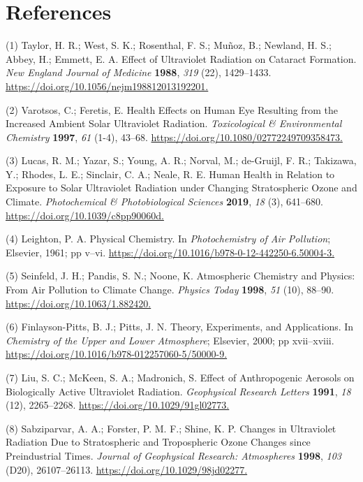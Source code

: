 \documentclass[10pt]{article}
\begin{document}
\FloatBarrier
\section*{References}\sloppy
{}
\label{csl:1}(1) Taylor, H. R.; West, S. K.; Rosenthal, F. S.; Mu{\~{n}}oz, B.; Newland, H. S.; Abbey, H.; Emmett, E. A. {Effect of Ultraviolet Radiation on Cataract Formation}. \textit{New England Journal of Medicine} \textbf{1988}, \textit{319} (22), 1429–1433. \url{https://doi.org/10.1056/nejm198812013192201.}

\label{csl:2}(2) Varotsos, C.; Feretis, E. {Health Effects on Human Eye Resulting from the Increased Ambient Solar Ultraviolet Radiation}. \textit{Toxicological {\&} Environmental Chemistry} \textbf{1997}, \textit{61} (1-4), 43–68. \url{https://doi.org/10.1080/02772249709358473.}

\label{csl:3}(3) Lucas, R. M.; Yazar, S.; Young, A. R.; Norval, M.; de-Gruijl, F. R.; Takizawa, Y.; Rhodes, L. E.; Sinclair, C. A.; Neale, R. E. {Human Health in Relation to Exposure to Solar Ultraviolet Radiation under Changing Stratospheric Ozone and Climate}. \textit{Photochemical {\&} Photobiological Sciences} \textbf{2019}, \textit{18} (3), 641–680. \url{https://doi.org/10.1039/c8pp90060d.}

\label{csl:4}(4) Leighton, P. A. {Physical Chemistry}. In \textit{Photochemistry of Air Pollution}; Elsevier, 1961; pp v--vi. \url{https://doi.org/10.1016/b978-0-12-442250-6.50004-3.}

\label{csl:5}(5) Seinfeld, J. H.; Pandis, S. N.; Noone, K. {Atmospheric Chemistry and Physics: From Air Pollution to Climate Change}. \textit{Physics Today} \textbf{1998}, \textit{51} (10), 88–90. \url{https://doi.org/10.1063/1.882420.}

\label{csl:6}(6) Finlayson-Pitts, B. J.; Pitts, J. N. {Theory, Experiments, and Applications}. In \textit{Chemistry of the Upper and Lower Atmosphere}; Elsevier, 2000; pp xvii--xviii. \url{https://doi.org/10.1016/b978-012257060-5/50000-9.}

\label{csl:7}(7) Liu, S. C.; McKeen, S. A.; Madronich, S. {Effect of Anthropogenic Aerosols on Biologically Active Ultraviolet Radiation}. \textit{Geophysical Research Letters} \textbf{1991}, \textit{18} (12), 2265–2268. \url{https://doi.org/10.1029/91gl02773.}

\label{csl:8}(8) Sabziparvar, A. A.; Forster, P. M. F.; Shine, K. P. {Changes in Ultraviolet Radiation Due to Stratospheric and Tropospheric Ozone Changes since Preindustrial Times}. \textit{Journal of Geophysical Research: Atmospheres} \textbf{1998}, \textit{103} (D20), 26107–26113. \url{https://doi.org/10.1029/98jd02277.}
\end{document}
